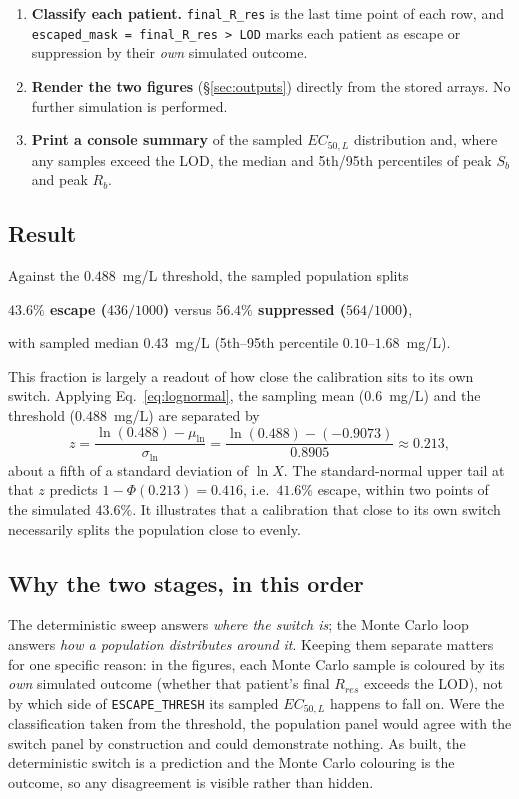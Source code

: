 \documentclass[11pt]{article}
\begin{document}
\begin{enumerate}
\item \textbf{Classify each patient.} \texttt{final\_R\_res} is the last
time point of each row, and \texttt{escaped\_mask = final\_R\_res > LOD}
marks each patient as escape or suppression by their \emph{own} simulated
outcome.

\item \textbf{Render the two figures} (\S\ref{sec:outputs}) directly from
the stored arrays.  No further simulation is performed.

\item \textbf{Print a console summary} of the sampled $EC_{50,L}$
distribution and, where any samples exceed the LOD, the median and
5th/95th percentiles of peak $S_b$ and peak $R_b$.
\end{enumerate}

\subsection{Result}

Against the $0.488$~mg/L threshold, the sampled population splits
\begin{center}
\textbf{$43.6\%$ escape ($436/1000$)} \quad versus \quad
\textbf{$56.4\%$ suppressed ($564/1000$)},
\end{center}
with sampled median $0.43$~mg/L (5th--95th percentile
$0.10$--$1.68$~mg/L).

This fraction is largely a readout of how close the calibration sits to its
own switch. Applying Eq.~\eqref{eq:lognormal}, the sampling mean
($0.6$~mg/L) and the threshold ($0.488$~mg/L) are separated by
\begin{equation}
z = \frac{\ln(0.488) - \mu_{\ln}}{\sigma_{\ln}}
  = \frac{\ln(0.488) - (-0.9073)}{0.8905} \approx 0.213,
\end{equation}
about a fifth of a standard deviation of $\ln X$. The standard-normal upper
tail at that $z$ predicts $1 - \Phi(0.213) = 0.416$, i.e.\ $41.6\%$ escape,
within two points of the simulated $43.6\%$.  It illustrates that a calibration that close to its own switch necessarily splits the population close to evenly.

\subsection{Why the two stages, in this order}
\label{sec:agreement}

The deterministic sweep answers \emph{where the switch is}; the Monte Carlo
loop answers \emph{how a population distributes around it}. Keeping them
separate matters for one specific reason: in the figures, each Monte Carlo
sample is coloured by its \emph{own} simulated outcome (whether that
patient's final $R_{res}$ exceeds the LOD), not by which side of
\texttt{ESCAPE\_THRESH} its sampled $EC_{50,L}$ happens to fall on. Were
the classification taken from the threshold, the population panel would
agree with the switch panel by construction and could demonstrate nothing.
As built, the deterministic switch is a prediction and the Monte Carlo
colouring is the outcome, so any disagreement is visible rather than
hidden.
\end{document}
